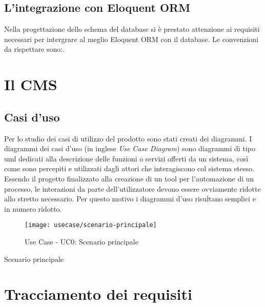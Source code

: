 \subsection{L'integrazione con Eloquent ORM}
Nella progettazione dello schema del database si è prestato attenzione ai requisiti necessari per intergrare al meglio Eloquent ORM con il database. Le convenzioni da rispettare sono:.

\section{Il CMS}

\subsection{Casi d'uso}

Per lo studio dei casi di utilizzo del prodotto sono stati creati dei diagrammi.
I diagrammi dei casi d'uso (in inglese \emph{Use Case Diagram}) sono diagrammi di tipo \gls{uml} dedicati alla descrizione delle funzioni o servizi offerti da un sistema, così come sono percepiti e utilizzati dagli attori che interagiscono col sistema stesso.
Essendo il progetto finalizzato alla creazione di un tool per l'automazione di un processo, le interazioni da parte dell'utilizzatore devono essere ovviamente ridotte allo stretto necessario. Per questo motivo i diagrammi d'uso risultano semplici e in numero ridotto.

\begin{figure}[!h] 
    \centering 
    \texttt{[image: usecase/scenario-principale]} 
    \caption{Use Case - UC0: Scenario principale}
\end{figure}

\begin{usecase}{0}{Scenario principale}
\label{uc:scenario-principale}
\end{usecase}

\section{Tracciamento dei requisiti}

